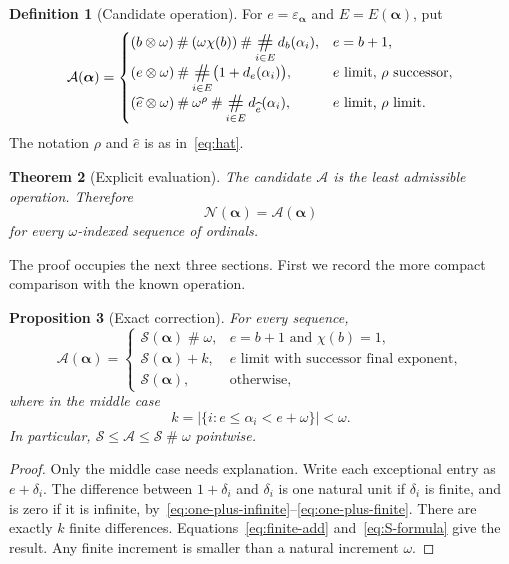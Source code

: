 \documentclass[11pt,letterpaper]{article}
\newtheorem{theorem}{Theorem}[section]
\newtheorem{proposition}[theorem]{Proposition}
\theoremstyle{definition}
\newtheorem{definition}[theorem]{Definition}
\theoremstyle{remark}
\newcommand{\Nop}{\mathcal N}
\newcommand{\Sop}{\mathcal S}
\newcommand{\Aop}{\mathcal A}
\newcommand{\seq}[1]{\boldsymbol{#1}}
\newcommand{\ns}{\mathbin{\#}}
\newcommand{\np}{\mathbin{\otimes}}
\newcommand{\NS}{\mathop{\mathchoice{\vcenter{\hbox{\Large\#}}}{\vcenter{\hbox{\large\#}}}{\#}{\#}}}
\newcommand{\epsa}{\varepsilon_{\seq\alpha}}
\newcommand{\diff}[2]{d_{#1}(#2)}
\newcommand{\chip}{\chi}
\begin{document}
\begin{definition}[Candidate operation]\label{def:A}
For $e=\epsa$ and $E=E(\seq\alpha)$, put
\begin{equation}\label{eq:A-formula}
\Aop(\seq\alpha)=
\begin{cases}
 (b\np\omega)\ns(\omega\chip(b))
       \ns\displaystyle\NS_{i\in E}\diff b{\alpha_i},
       &e=b+1,\\[4pt]
 (e\np\omega)\ns\displaystyle\NS_{i\in E}
            \bigl(1+\diff e{\alpha_i}\bigr),
       &e\text{ limit, }\rho\text{ successor},\\[4pt]
 (\widehat e\np\omega)\ns\omega^\rho
       \ns\displaystyle\NS_{i\in E}\diff{\widehat e}{\alpha_i},
       &e\text{ limit, }\rho\text{ limit}.
\end{cases}
\end{equation}
The notation $\rho$ and $\widehat e$ is as in~\eqref{eq:hat}.
\end{definition}

\begin{theorem}[Explicit evaluation]\label{thm:main}
The candidate $\Aop$ is the least admissible operation. Therefore
\[
 \boxed{\Nop(\seq\alpha)=\Aop(\seq\alpha)}
\]
for every $\omega$-indexed sequence of ordinals.
\end{theorem}

The proof occupies the next three sections. First we record the more compact comparison with the known operation.

\begin{proposition}[Exact correction]\label{prop:correction}
For every sequence,
\begin{equation}\label{eq:correction}
\Aop(\seq\alpha)=
\begin{cases}
 \Sop(\seq\alpha)\ns\omega,
   &e=b+1\text{ and }\chip(b)=1,\\
 \Sop(\seq\alpha)+k,
   &e\text{ limit with successor final exponent},\\
 \Sop(\seq\alpha),&\text{otherwise},
\end{cases}
\end{equation}
where in the middle case
\begin{equation}\label{eq:k}
 k=\bigl|\{i:e\le\alpha_i<e+\omega\}\bigr|<\omega.
\end{equation}
In particular, $\Sop\le\Aop\le\Sop\ns\omega$ pointwise.
\end{proposition}
\begin{proof}
Only the middle case needs explanation. Write each exceptional entry as $e+\delta_i$. The difference between $1+\delta_i$ and $\delta_i$ is one natural unit if $\delta_i$ is finite, and is zero if it is infinite, by~\eqref{eq:one-plus-infinite}--\eqref{eq:one-plus-finite}. There are exactly $k$ finite differences. Equations~\eqref{eq:finite-add} and~\eqref{eq:S-formula} give the result. Any finite increment is smaller than a natural increment $\omega$.
\end{proof}
\end{document}
